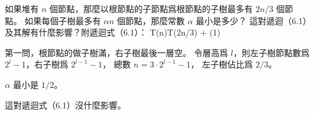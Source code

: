 \startEXERCISE
如果堆有 $n$ 個節點，那麼以根節點的子節點爲根節點的子樹最多有 $2n/3$ 個節點。
如果每個子樹最多有 $\alpha n$ 個節點，那麼常數 $\alpha$ 最小是多少？
這對遞迴（6.1）及其解有什麼影響？附遞迴式（6.1）：
\startformula
T(n)\le T(2n/3) + \Theta(1)
\stopformula
\stopEXERCISE

\startANSWER
第一問，根節點的做子樹滿，右子樹最後一層空。
令層高爲 $l$，則左子樹節點數爲 $2^l - 1$，右子樹爲 $2^{l-1} - 1$，
總數 $n=3 \cdot 2^{l-1} - 1$，
左子樹佔比爲 $2/3$。

$\alpha$ 最小是 $1/2$。

這對遞迴式（6.1）沒什麼影響。
\stopANSWER
